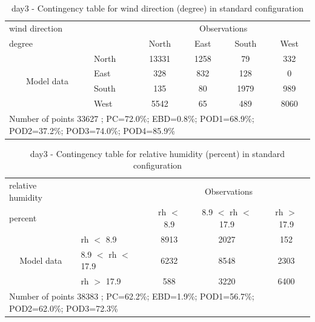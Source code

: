 \begin{table}[p!]
\begin{center}
\begin{tabular}{llcccc}
\hline
{wind direction}                                       &                             &    \multicolumn{4}{c}{Observations}                 \\
{degree}                                       &                             & {North}   & {East} & {South} & {West} \\
\hline
\multicolumn{1}{c}{\multirow{4}{*}{Model data}}  & {North}                    & 13331   & 1258    & 79     & 332\\
                                                 & {East}                     & 328   & 832    & 128     & 0\\
                                                 & {South}                    & 135   & 80   & 1979    & 989\\
                                                 & {West}                     & 5542  & 65   & 489    & 8060\\
\hline 
\multicolumn{6}{l}{ Number of points        33627 ; PC=72.0\%; EBD=0.8\%; POD1=68.9\%; POD2=37.2\%; POD3=74.0\%; POD4=85.9\%}                 \\
\end{tabular}
\end{center}
\caption{day3 - Contingency table for {wind direction} (degree) in standard configuration}
\label{tab:contingencywdBEF:day3}
\end{table}
\begin{table}[p!]
\begin{center}
\begin{tabular}{llccc}
\hline
{relative humidity}                                       &                                                    & \multicolumn{3}{c}{Observations}                 \\
{percent}                                       &                             & rh $<$ 8.9   & 8.9 $<$ rh $<$ 17.9 & rh $>$ 17.9 \\
\hline
\multicolumn{1}{c}{\multirow{3}{*}{Model data}}  & rh $<$ 8.9             & 8913                & 2027                       & 152              \\
                                                 & 8.9  $<$ rh $<$ 17.9 & 6232                & 8548                       & 2303              \\
                                                 & rh $>$ 17.9             & 588                & 3220                       & 6400              \\
\hline
\multicolumn{5}{l}{ Number of points        38383 ; PC=62.2\%; EBD=1.9\%; POD1=56.7\%; POD2=62.0\%; POD3=72.3\%}
\end{tabular}
\end{center}
\caption{day3 - Contingency table for  relative humidity (percent) in standard configuration}
\label{tab:contingencyrhBEF:day3}
\end{table}
